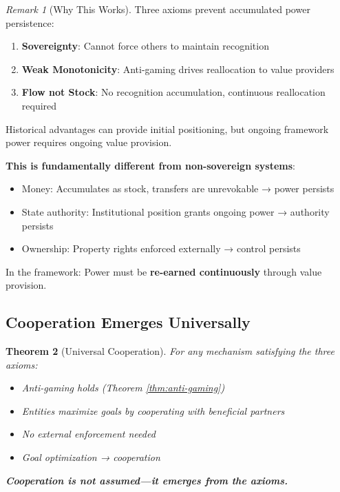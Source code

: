 \documentclass[11pt,a4paper]{article}
\newtheorem{theorem}{Theorem}[section]
\theoremstyle{definition}
\theoremstyle{remark}
\newtheorem{remark}[theorem]{Remark}
\begin{document}
\begin{remark}[Why This Works]
Three axioms prevent accumulated power persistence:

\begin{enumerate}
\item \textbf{Sovereignty}: Cannot force others to maintain recognition
\item \textbf{Weak Monotonicity}: Anti-gaming drives reallocation to value providers
\item \textbf{Flow not Stock}: No recognition accumulation, continuous reallocation required
\end{enumerate}

Historical advantages can provide initial positioning, but ongoing framework power requires ongoing value provision.

\textbf{This is fundamentally different from non-sovereign systems}:
\begin{itemize}
\item Money: Accumulates as stock, transfers are unrevokable → power persists
\item State authority: Institutional position grants ongoing power → authority persists
\item Ownership: Property rights enforced externally → control persists
\end{itemize}

In the framework: Power must be \textbf{re-earned continuously} through value provision.
\end{remark}

\subsection{Cooperation Emerges Universally}

\begin{theorem}[Universal Cooperation]
For \textit{any} mechanism satisfying the three axioms:
\begin{itemize}
\item Anti-gaming holds (Theorem \ref{thm:anti-gaming})
\item Entities maximize goals by cooperating with beneficial partners
\item No external enforcement needed
\item Goal optimization → cooperation
\end{itemize}

\textbf{Cooperation is not assumed—it emerges from the axioms.}
\end{theorem}
\end{document}
